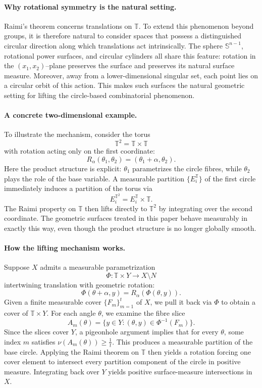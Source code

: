 \documentclass[11pt]{article}
\numberwithin{equation}{section}
\theoremstyle{remark}
\begin{document}
\paragraph{Why rotational symmetry is the natural setting.}
Raimi’s theorem concerns translations on $\mathbb{T}$.
To extend this phenomenon beyond groups, it is therefore natural to consider spaces that possess a distinguished circular direction along which translations act intrinsically.
The sphere $\mathbb{S}^{n-1}$, rotational power surfaces,
and circular cylinders all share this feature:
rotation in the $(x_1,x_2)$–plane preserves the surface and preserves its natural surface measure.
Moreover, away from a lower-dimensional singular set,
each point lies on a circular orbit of this action.
This makes such surfaces the natural geometric setting
for lifting the circle-based combinatorial phenomenon.

\paragraph{A concrete two-dimensional example.}
To illustrate the mechanism, consider the torus
\[
\mathbb{T}^2 = \mathbb{T} \times \mathbb{T}
\]
with rotation acting only on the first coordinate:
\[
R_\alpha(\theta_1,\theta_2) = (\theta_1+\alpha,\theta_2).
\]
Here the product structure is explicit:
$\theta_1$ parametrizes the circle fibres,
while $\theta_2$ plays the role of the base variable.
A measurable partition $\{E_i^{\mathbb{T}}\}$ of the first circle immediately induces a partition of the torus via
\[
E_i^{\mathbb{T}^2} = E_i^{\mathbb{T}} \times \mathbb{T}.
\]
The Raimi property on $\mathbb{T}$ then lifts directly to $\mathbb{T}^2$ by integrating over the second coordinate.
The geometric surfaces treated in this paper behave measurably in exactly this way, even though the product structure is no longer globally smooth.

\paragraph{How the lifting mechanism works.}
Suppose $X$ admits a measurable parametrization
\[
\Phi : \mathbb{T} \times Y \longrightarrow X \setminus N
\]
intertwining translation with geometric rotation:
\[
\Phi(\theta+\alpha,y)=R_\alpha(\Phi(\theta,y)).
\]
Given a finite measurable cover $\{F_m\}_{m=1}^t$ of $X$,
we pull it back via $\Phi$ to obtain a cover of $\mathbb{T}\times Y$.
For each angle $\theta$, we examine the fibre slice
\[
A_m(\theta)=\{y\in Y:(\theta,y)\in\Phi^{-1}(F_m)\}.
\]
Since the slices cover $Y$, a pigeonhole argument implies that for every $\theta$, some index $m$ satisfies $\nu(A_m(\theta))\ge \frac{1}{t}$.
This produces a measurable partition of the base circle.
Applying the Raimi theorem on $\mathbb{T}$ then yields a rotation forcing one cover element to intersect every partition component of the circle in positive measure.
Integrating back over $Y$ yields positive surface-measure intersections in $X$.
\end{document}
